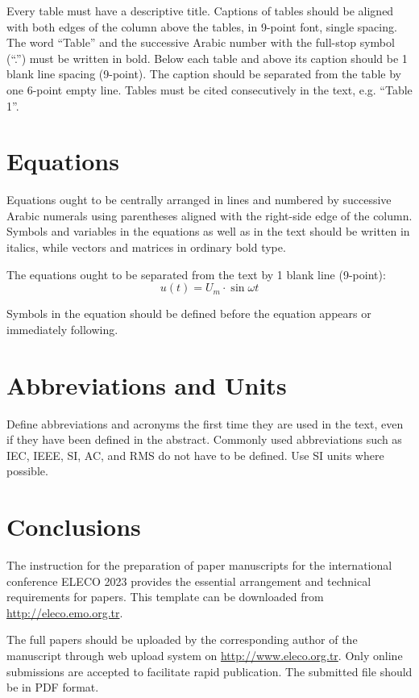 \documentclass[9pt]{extarticle}
\begin{document}
Every table must have a descriptive title. Captions of tables should be aligned with both edges of the column above the tables, in 9-point font, single spacing. The word ``Table'' and the successive Arabic number with the full-stop symbol (``.'') must be written in bold. Below each table and above its caption should be 1 blank line spacing (9-point). The caption should be separated from the table by one 6-point empty line. Tables must be cited consecutively in the text, e.g. ``Table 1''.


\section{Equations}

Equations ought to be centrally arranged in lines and numbered by successive Arabic numerals using parentheses aligned with the right-side edge of the column. Symbols and variables in the equations as well as in the text should be written in italics, while vectors and matrices in ordinary bold type.

The equations ought to be separated from the text by 1 blank line (9-point):
%
\begin{equation}
	\label{eqn:voltage-sine}
	u(t) = U_m \cdot \sin \omega t
\end{equation}

Symbols in the equation should be defined before the equation appears or immediately following.

\section{Abbreviations and Units}

Define abbreviations and acronyms the first time they are used in the text, even if they have been defined in the abstract. Commonly used abbreviations such as IEC, IEEE, SI, AC, and RMS do not have to be defined. Use SI units where possible.

\section{Conclusions}

The instruction for the preparation of paper manuscripts for the international conference ELECO 2023 provides the essential arrangement and technical requirements for papers. This template can be downloaded from \url{http://eleco.emo.org.tr}.

The full papers should be uploaded by the corresponding author of the manuscript through web upload system on \url{http://www.eleco.org.tr}. Only online submissions are accepted to facilitate rapid publication. The submitted file should be in PDF format.
\end{document}
